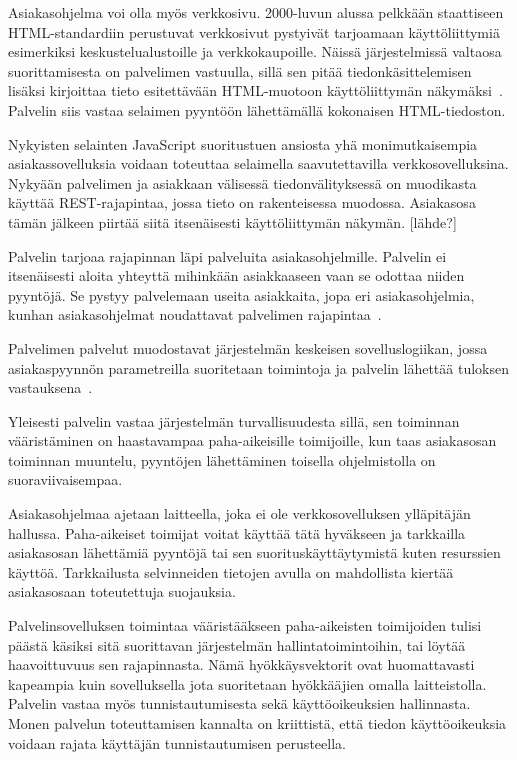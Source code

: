 \documentclass[12pt]{article}
\begin{document}
Asiakasohjelma voi olla myös verkkosivu. 2000-luvun alussa
pelkkään staattiseen HTML-standardiin perustuvat verkkosivut pystyivät
tarjoamaan käyttöliittymiä esimerkiksi keskustelualustoille ja verkkokaupoille.
Näissä järjestelmissä valtaosa suorittamisesta on palvelimen vastuulla,
sillä sen pitää tiedonkäsittelemisen lisäksi kirjoittaa tieto
esitettävään HTML-muotoon käyttöliittymän näkymäksi~\cite{tatsubori_html_2009}. Palvelin
siis vastaa selaimen pyyntöön lähettämällä kokonaisen HTML-tiedoston.

Nykyisten selainten JavaScript suoritustuen ansiosta yhä
monimutkaisempia asiakassovelluksia voidaan toteuttaa
selaimella saavutettavilla verkkosovelluksina.
Nykyään palvelimen ja asiakkaan
välisessä tiedonvälityksessä on muodikasta käyttää REST-rajapintaa, jossa
tieto on rakenteisessa muodossa. Asiakasosa tämän jälkeen piirtää siitä
itsenäisesti käyttöliittymän näkymän. [lähde?]

Palvelin tarjoaa rajapinnan läpi palveluita asiakasohjelmille.
Palvelin ei itsenäisesti aloita yhteyttä mihinkään
asiakkaaseen vaan se odottaa niiden pyyntöjä.
Se pystyy palvelemaan useita asiakkaita, jopa
eri asiakasohjelmia, kunhan asiakasohjelmat noudattavat
palvelimen rajapintaa~\cite{sinha_client-server_1992}.

Palvelimen palvelut muodostavat järjestelmän keskeisen
sovelluslogiikan, jossa asiakaspyynnön parametreilla
suoritetaan toimintoja ja palvelin lähettää
tuloksen vastauksena~\cite{sinha_client-server_1992}.

Yleisesti palvelin vastaa järjestelmän turvallisuudesta sillä,
sen toiminnan vääristäminen on haastavampaa paha-aikeisille
toimijoille, kun taas asiakasosan toiminnan muuntelu, pyyntöjen
lähettäminen toisella ohjelmistolla on suoraviivaisempaa.

Asiakasohjelmaa ajetaan laitteella, joka ei ole verkkosovelluksen
ylläpitäjän hallussa. Paha-aikeiset toimijat voitat käyttää tätä hyväkseen
ja tarkkailla asiakasosan lähettämiä pyyntöjä tai sen
suorituskäyttäytymistä kuten resurssien käyttöä.
Tarkkailusta selvinneiden tietojen avulla on mahdollista
kiertää asiakasosaan toteutettuja suojauksia.

Palvelinsovelluksen toimintaa vääristääkseen 
paha-aikeisten toimijoiden tulisi päästä
käsiksi sitä suorittavan järjestelmän hallintatoimintoihin, tai
löytää haavoittuvuus sen rajapinnasta. Nämä hyökkäysvektorit
ovat huomattavasti kapeampia kuin sovelluksella jota
suoritetaan hyökkääjien omalla laitteistolla.
Palvelin vastaa myös tunnistautumisesta sekä käyttöoikeuksien hallinnasta.
Monen palvelun toteuttamisen kannalta on kriittistä, että
tiedon käyttöoikeuksia voidaan rajata käyttäjän tunnistautumisen perusteella.
\end{document}
